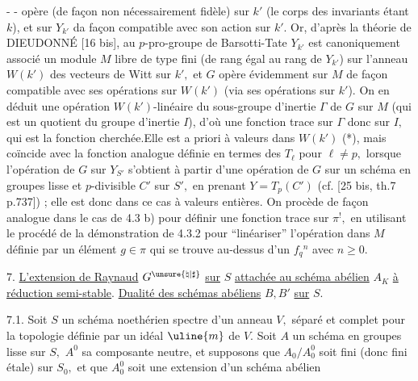 -  -
opère (de façon non nécessairement fidèle) sur \(k'\) (le corps des invariants étant \(k\)), et sur \(Y_{k'}\) da façon compatible avec son action sur \(k'.\) Or, d'après la théorie de DIEUDONNÉ [16 bis], au \(p\)-pro-groupe de Barsotti-Tate \(Y_{k'}\) est canoniquement associé un module \(M\) libre de type fini (de rang égal au rang de \(Y_{k'}\)) sur l'anneau \(W(k')\) des vecteurs de Witt sur \(k',\) et \(G\) opère évidemment sur \(M\) de façon compatible avec ses opérations sur \(W(k')\) (via ses opérations sur \(k'\)). On en déduit une opération \(W(k')\)-linéaire du sous-groupe d'inertie \(\Gamma\) de \(G\) sur \(M\) (qui est un quotient du groupe d'inertie \(I\)), d'où une fonction trace sur \(\Gamma\) donc sur \(I,\) qui est la fonction cherchée.Elle est a priori à valeurs dans \(W(k')\) (*), mais coïncide avec la fonction analogue définie en termes des \(T_\ell\) pour \(\ell\neq p,\) lorsque l'opération de \(G\) sur \(Y_{S'}\) s'obtient à partir d'une opération de \(G\) sur un schéma en groupes lisse et \(p\)-divisible \(C'\) sur \(S',\) en prenant \(Y=T_p(C')\) (cf. [25 bis, th.7 p.737]) ; elle est donc dans ce cas à valeurs entières. On procède de façon analogue dans le cas de 4.3 b) pour définir une fonction trace sur \(\pi^!,\) en utilisant le procédé de la démonstration de 4.3.2 pour ``linéariser'' l'opération dans \(M\) définie par un élément \(g\in\pi\) qui se trouve au-dessus d'un \(f_q{}^n\) avec \(n\geq0.\)

7. \uline{L'extension de Raynaud} \(G^{\unsure{\natural|\sharp}}\) \uline{sur} \(S\) \uline{attachée au schéma abélien} \(A_K\) \uline{à réduction semi-stable}. \uline{Dualité des schémas abéliens} \(B,B'\) \uline{sur} \(S.\)

7.1. Soit \(S\) un schéma noethérien spectre d'un anneau \(V,\) séparé et complet pour la topologie définie par un idéal \(\uline{m}\) de \(V.\) Soit \(A\) un schéma en groupes lisse sur \(S,\) \(A^0\) sa composante neutre, et supposons que \(A_0/A_0^0\) soit fini (donc fini étale) sur \(S_0,\) et que \(A_0^0\) soit une extension d'un schéma abélien

